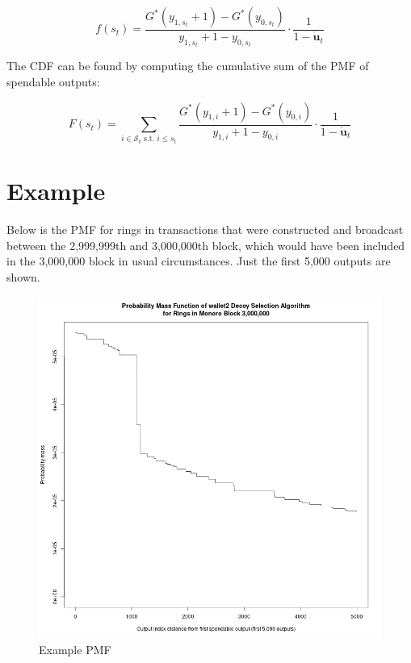 \documentclass{article}
\begin{document}
\begin{equation}
f(s_{t})=\dfrac{G^{*}\left(y_{1,s_{t}}+1\right)-G^{*}\left(y_{0,s_{t}}\right)}{y_{1,s_{t}}+1-y_{0,s_{t}}}\cdot\dfrac{1}{1-\mathring{\mathbf{u}}_{t}}
\end{equation}

The CDF can be found by computing the cumulative sum of the PMF of
spendable outputs:

\begin{equation}
F(s_{t})=\underset{i\in\mathcal{S}_{t}\textrm{ s.t. }i\leq s_{t}}{\sum}\dfrac{G^{*}\left(y_{1,i}+1\right)-G^{*}\left(y_{0,i}\right)}{y_{1,i}+1-y_{0,i}}\cdot\dfrac{1}{1-\mathring{\mathbf{u}}_{t}}
\end{equation}


\section{Example}

Below is the PMF for rings in transactions that were constructed and
broadcast between the 2,999,999th and 3,000,000th block, which would
have been included in the 3,000,000 block in usual circumstances.
Just the first 5,000 outputs are shown.

\begin{figure}
    \centering
    \includegraphics[width=1\linewidth]{images/wallet2-DSA-plot-draft.png}
    \caption{Example PMF}
    \label{fig:enter-label}
\end{figure}
\end{document}
